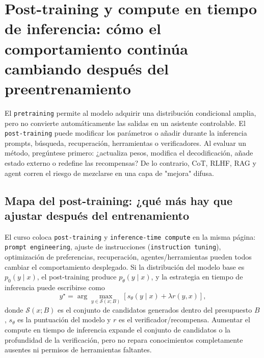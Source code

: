 \section{Post-training y compute en tiempo de inferencia: cómo el comportamiento continúa cambiando después del preentrenamiento}

El \texttt{pretraining} permite al modelo adquirir una distribución condicional amplia, pero no convierte automáticamente las salidas en un asistente controlable. El \texttt{post-training} puede modificar los parámetros o añadir durante la inferencia prompts, búsqueda, recuperación, herramientas o verificadores. Al evaluar un método, pregúntese primero: ¿actualiza pesos, modifica el decodificación, añade estado externo o redefine las recompensas? De lo contrario, CoT, RLHF, RAG y agent corren el riesgo de mezclarse en una capa de "mejora" difusa.

\subsection{Mapa del post-training: ¿qué más hay que ajustar después del entrenamiento}

El curso coloca \texttt{post-training} y \texttt{inference-time compute} en la misma página: \texttt{prompt engineering}, ajuste de instrucciones (\texttt{instruction tuning}), optimización de preferencias, recuperación, agentes/herramientas pueden todos cambiar el comportamiento desplegado. Si la distribución del modelo base es $p_0(y\mid x)$, el post-training produce $p_{\theta}(y\mid x)$, y la estrategia en tiempo de inferencia puede escribirse como
\[
y^{\star}=\arg\max_{y\in\mathcal{S}(x;B)}
\left[s_{\theta}(y\mid x)+\lambda r(y,x)\right],
\]
donde $\mathcal{S}(x;B)$ es el conjunto de candidatos generados dentro del presupuesto $B$, $s_{\theta}$ es la puntuación del modelo y $r$ es el verificador/recompensa. Aumentar el compute en tiempo de inferencia expande el conjunto de candidatos o la profundidad de la verificación, pero no repara conocimientos completamente ausentes ni permisos de herramientas faltantes.



